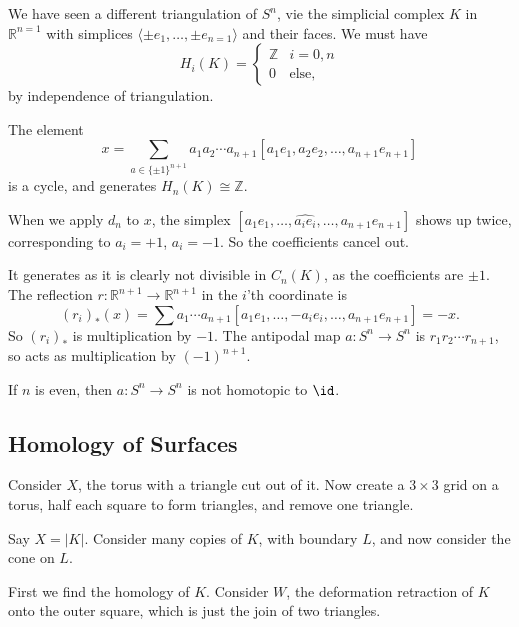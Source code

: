 \documentclass[12pt]{article}
\begin{document}
We have seen a different triangulation of $S^n$, vie the simplicial complex $K$ in $\mathbb{R}^{n=1}$ with simplices $\langle \pm e_1, \ldots, \pm e_{n=1} \rangle$ and their faces. We must have
\[
H_i(K) =
\begin{cases}
	\mathbb{Z} & i = 0, n \\
	0 &\text{else},
\end{cases}
\]
by independence of triangulation.

\begin{lemma}
	The element
	\[
		x = \sum_{a \in \{\pm1\}^{n+1}} a_1 a_2 \cdots a_{n+1} [a_1 e_1, a_2e_2, \ldots, a_{n+1} e_{n+1}]
	\]
	is a cycle, and generates $H_n(K) \cong \mathbb{Z}$.
\end{lemma}

\begin{proofbox}
	When we apply $d_n$ to $x$, the simplex $[a_1 e_1, \ldots, \hat{a_i e_i}, \ldots, a_{n+1} e_{n+1}]$ shows up twice, corresponding to $a_i = +1$, $a_i = -1$. So the coefficients cancel out.

	It generates as it is clearly not divisible in $C_n(K)$, as the coefficients are $\pm1$. The reflection  $r : \mathbb{R}^{n+1} \to \mathbb{R}^{n+1}$ in the $i$'th coordinate is
	\[
		(r_i)_\ast(x) = \sum a_1 \cdots a_{n+1} [a_1e_1, \ldots, -a_i e_i, \ldots, a_{n+1} e_{n+1}] = -x.
	\]
	So $(r_i)_\ast$ is multiplication by $-1$. The antipodal map $a : S^n \to S^n$ is $r_1 r_2 \cdots r_{n+1}$, so acts as multiplication by $(-1)^{n+1}$.
\end{proofbox}

\begin{corollary}
	If $n$ is even, then $a : S^n \to S^n$ is not homotopic to $\id$.
\end{corollary}

\subsection{Homology of Surfaces}%
\label{sub:surf_hom}

\begin{exbox}
	Consider $X$, the torus with a triangle cut out of it. Now create a $3 \times 3$ grid on a torus, half each square to form triangles, and remove one triangle.

	Say $X = |K|$. Consider many copies of $K$, with boundary $L$, and now consider the cone on $L$.
\end{exbox}

First we find the homology of $K$. Consider $W$, the deformation retraction of $K$ onto the outer square, which is just the join of two triangles.
\end{document}
